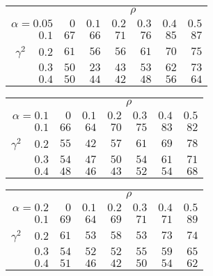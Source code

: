 \begin{tabular}{r|rrrrrr}
\hline\hline
 &\multicolumn{6}{c}{$\rho$} \\ 
 $\alpha = 0.05$ & $0$ & $0.1$ & $0.2$ & $0.3$ & $0.4$ & $0.5$ \\ 
 \hline$0.1$ & $67$ & $66$ & $71$ & $76$ & $85$ & $87$\\ 
$\gamma^2\;\;\;$ $0.2$ & $61$ & $56$ & $56$ & $61$ & $70$ & $75$\\ 
$0.3$ & $50$ & $23$ & $43$ & $53$ & $62$ & $73$\\ 
$0.4$ & $50$ & $44$ & $42$ & $48$ & $56$ & $64$\\ 
 \hline 
 \end{tabular}
 
 \vspace{2em} 
 
\begin{tabular}{r|rrrrrr}
\hline\hline
 &\multicolumn{6}{c}{$\rho$} \\ 
 $\alpha = 0.1$ & $0$ & $0.1$ & $0.2$ & $0.3$ & $0.4$ & $0.5$ \\ 
 \hline$0.1$ & $66$ & $64$ & $70$ & $75$ & $83$ & $82$\\ 
$\gamma^2\;\;\;$ $0.2$ & $55$ & $42$ & $57$ & $61$ & $69$ & $78$\\ 
$0.3$ & $54$ & $47$ & $50$ & $54$ & $61$ & $71$\\ 
$0.4$ & $48$ & $46$ & $43$ & $52$ & $54$ & $68$\\ 
 \hline 
 \end{tabular}
 
 \vspace{2em} 
 
\begin{tabular}{r|rrrrrr}
\hline\hline
 &\multicolumn{6}{c}{$\rho$} \\ 
 $\alpha = 0.2$ & $0$ & $0.1$ & $0.2$ & $0.3$ & $0.4$ & $0.5$ \\ 
 \hline$0.1$ & $69$ & $64$ & $69$ & $71$ & $71$ & $89$\\ 
$\gamma^2\;\;\;$ $0.2$ & $61$ & $53$ & $58$ & $53$ & $73$ & $74$\\ 
$0.3$ & $54$ & $52$ & $52$ & $55$ & $59$ & $65$\\ 
$0.4$ & $51$ & $46$ & $42$ & $50$ & $54$ & $62$\\ 
 \hline 
 \end{tabular}